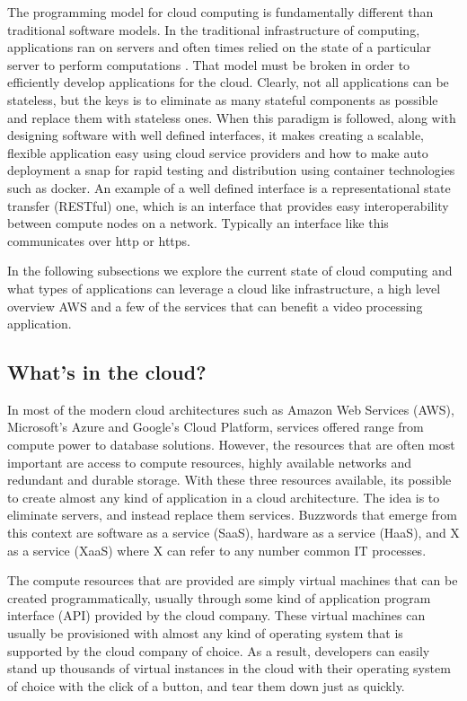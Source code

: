 The programming model for cloud computing is fundamentally different than
traditional software models. In the traditional infrastructure of computing,
applications ran on servers and often times relied on the state of a particular
server to perform computations \cite{awsbestpractices}. That model must be
broken in order to efficiently develop applications for the cloud. Clearly, not
all applications can be stateless, but the keys is to eliminate as many stateful
components as possible and replace them with stateless ones. When this paradigm
is followed, along with designing software with well defined interfaces, it makes creating a scalable, flexible application easy using cloud
service providers \cite{awsbestpractices} and how to make auto deployment a snap
for rapid testing and distribution using container technologies such as docker.
An example of a well defined interface is a representational state transfer (RESTful) one,
 which is an interface that provides easy interoperability between compute nodes
 on a network. Typically an interface like this communicates over http or https.

In the following subsections we explore the current state of cloud computing and
what types of applications can leverage a cloud like infrastructure, a high
level overview AWS and a few of the services that can benefit a video processing
application.

\subsection{\label{subsection:in_the_cloud}What's in the cloud?}
In most of the modern cloud architectures such as Amazon Web Services (AWS),
Microsoft's Azure and Google's Cloud Platform, services offered range from
compute power to database solutions. However, the resources that are often
most important are access to compute resources, highly available networks and
redundant and durable storage. With these three resources available, its possible
to create almost any kind of application in a cloud architecture. The idea is
to eliminate servers, and instead replace them services. Buzzwords
that emerge from this context are software as a service (SaaS), hardware as a service
(HaaS), and X as a service (XaaS) where X can refer to any number common IT
processes.

The compute resources that are provided are simply virtual machines that can be
created programmatically, usually through some kind of application program
interface (API) provided by the cloud company. These virtual machines can
usually be provisioned with almost any kind of operating system that is
supported by the cloud company of choice. As a result, developers can easily
stand up thousands of virtual instances in the cloud with their operating system
of choice with the click of a button, and tear them down just as quickly.

